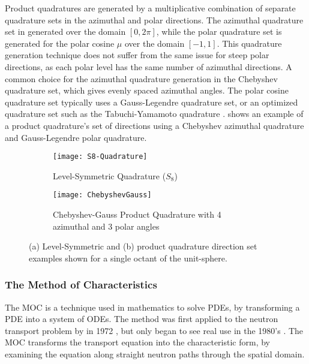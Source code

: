 {{{{                Product quadratures are generated by a multiplicative combination of separate quadrature sets in the azimuthal and polar directions.
                The azimuthal quadrature set in generated over the domain $[0,2\pi]$, while the polar quadrature set is generated for the polar cosine $\mu$ over the domain $[-1,1]$.
                This quadrature generation technique does not suffer from the same issue for steep polar directions, as each polar level has the same number of azimuthal directions.
                A common choice for the azimuthal quadrature generation in the Chebyshev quadrature set, which gives evenly spaced azimuthal angles.
                The polar cosine quadrature set typically uses a Gauss-Legendre quadrature set, or an optimized quadrature set such as the Tabuchi-Yamamoto quadrature \cite{TabuchiYamamotoQuad}.
                 shows an example of a product quadrature's set of directions using a Chebyshev azimuthal quadrature and Gauss-Legendre polar quadrature.

                \begin{figure}[h]
                    \centering
                    \begin{subfigure}[t]{0.45\linewidth}
                        \centering
                        \texttt{[image: S8-Quadrature]}
                        \caption{Level-Symmetric Quadrature ($S_8$)}
                        \label{fig:NTT:S8 Quadrature}
                    \end{subfigure}%
                    \hfill
                    \begin{subfigure}[t]{0.45\linewidth}
                        \centering
                        \texttt{[image: ChebyshevGauss]}
                        \caption{Chebyshev-Gauss Product Quadrature with 4 azimuthal and 3 polar angles}
                        \label{fig:NTT:ChebyshevGauss Quadrature}
                    \end{subfigure}
                    \caption{(a) Level-Symmetric and (b) product quadrature direction set examples shown for a single octant of the unit-sphere.}
                    \label{fig:NTT:Quadrature Examples}
                \end{figure}
            }
            \subsubsection{The Method of Characteristics}{\label{sssec:NTT:MOC}
                The \acf{MOC} is a technique used in mathematics to solve \acp{PDE}, by transforming a \ac{PDE} into a system of \acp{ODE}.
                The method was first applied to the neutron transport problem by \citeauthor{Askew1972} in 1972 \cite{Askew1972}, but only began to see real use in the 1980's \cite{Halsall1980}.
                The \ac{MOC} transforms the transport equation into the characteristic form, by examining the equation along straight neutron paths through the spatial domain.

}}}}
